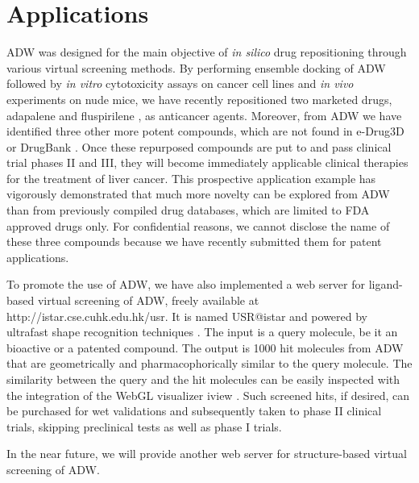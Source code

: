 \documentclass{bioinfo}
\begin{document}
\section{Applications}

ADW was designed for the main objective of \textit{in silico} drug repositioning through various virtual screening methods. By performing ensemble docking of ADW followed by \textit{in vitro} cytotoxicity assays on cancer cell lines and \textit{in vivo} experiments on nude mice, we have recently repositioned two marketed drugs, adapalene \citep{1681} and fluspirilene \citep{1667}, as anticancer agents. Moreover, from ADW we have identified three other more potent compounds, which are not found in e-Drug3D \citep{1125} or DrugBank \citep{1594}. Once these repurposed compounds are put to and pass clinical trial phases II and III, they will become immediately applicable clinical therapies for the treatment of liver cancer. This prospective application example has vigorously demonstrated that much more novelty can be explored from ADW than from previously compiled drug databases, which are limited to FDA approved drugs only. For confidential reasons, we cannot disclose the name of these three compounds because we have recently submitted them for patent applications.

To promote the use of ADW, we have also implemented a web server for ligand-based virtual screening of ADW, freely available at http://istar.cse.cuhk.edu.hk/usr. It is named USR@istar and powered by ultrafast shape recognition techniques \citep{1379,1331}. The input is a query molecule, be it an bioactive or a patented compound. The output is 1000 hit molecules from ADW that are geometrically and pharmacophorically similar to the query molecule. The similarity between the query and the hit molecules can be easily inspected with the integration of the WebGL visualizer iview \citep{1366}. Such screened hits, if desired, can be purchased for wet validations and subsequently taken to phase II clinical trials, skipping preclinical tests as well as phase I trials.



In the near future, we will provide another web server for structure-based virtual screening of ADW.
\end{document}
